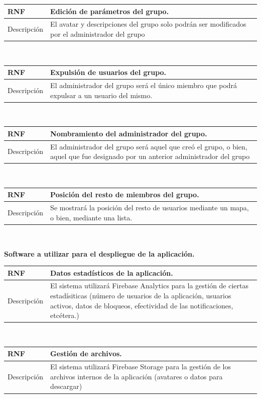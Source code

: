 \documentclass[twoside]{report}
\newcommand\addrow[2]{#1 &#2\\ }
\newcommand\addheading[2]{#1 &#2\\ \hline}
\newcommand\tabularhead{\begin{tabular}{lp{0.7\textwidth}}
\hline
}
\newenvironment{req}{\tabularhead}
{\hline\end{tabular}}
\begin{document}
\begin{req}
	\addheading{\textbf{RNF\arabic{nonFunctionalRequirements}}}{Edición de parámetros del grupo.}
	\addrow{Descripción}{El avatar y descripciones del grupo solo podrán ser modificados por el administrador del grupo}
\end{req}\\

\begin{req}
	\addheading{\textbf{RNF\arabic{nonFunctionalRequirements}}}{Expulsión de usuarios del grupo.}
	\addrow{Descripción}{El administrador del grupo será el único miembro que podrá expulsar a un usuario del mismo.}
\end{req}\\

\begin{req}
	\addheading{\textbf{RNF\arabic{nonFunctionalRequirements}}}{Nombramiento del administrador del grupo.}
	\addrow{Descripción}{El administrador del grupo será aquel que creó el grupo, o bien, aquel que fue designado por un anterior administrador del grupo}
\end{req}\\

\begin{req}
	\addheading{\textbf{RNF\arabic{nonFunctionalRequirements}}}{Posición del resto de miembros del grupo.}
	\addrow{Descripción}{Se mostrará la posición del resto de usuarios mediante un mapa, o bien, mediante una lista.}
\end{req}\\

\textbf{Software a utilizar para el despliegue de la aplicación.}\\

\begin{req}
	\addheading{\textbf{RNF\arabic{nonFunctionalRequirements}}}{Datos estadísticos de la aplicación.}
	\addrow{Descripción}{El sistema utilizará Firebase Analytics para la gestión de ciertas estadísiticas (número de usuarios de la aplicación, usuarios activos, datos de bloqueos, efectividad de las notificaciones, etcétera.)}
\end{req}\\

\begin{req}
	\addheading{\textbf{RNF\arabic{nonFunctionalRequirements}}}{Gestión de archivos.}
	\addrow{Descripción}{El sistema utilizará Firebase Storage para la gestión de los archivos internos de la aplicación (avatares o datos para descargar)}
\end{req}\\
\end{document}
